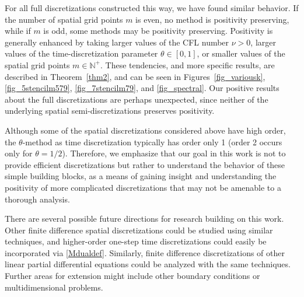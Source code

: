 \documentclass[smallextended,numbook,runningheads]{svjour3}     %
\begin{document}
For all full discretizations constructed this way, we have found similar behavior.
If the number of spatial grid points $m$ is even, no method is positivity
preserving, while if $m$ is odd, some methods may be positivity
preserving.  Positivity is generally enhanced by taking larger values
of the CFL number $\nu>0$, larger values of the time-discretization parameter $\theta\in [0,1]$, or smaller
values of the spatial grid points $m\in\mathbb{N}^+$.  These tendencies, and more specific results, are described
in Theorem~\ref{thm2}, and can be seen
in Figures~\ref{fig_variousk}, \ref{fig_5stencilm579}, \ref{fig_7stencilm79},
and \ref{fig_spectral}.
Our positive results about the full discretizations are perhaps unexpected, since neither of the underlying spatial semi-discretizations preserves positivity.

Although some of the spatial discretizations considered above have high order, the $\theta$-method as time discretization typically has order only 1 (order 2 occurs only for $\theta=1/2$). Therefore, we emphasize that our goal in this work is not to provide efficient discretizations but rather
to understand the behavior of these simple building blocks, as a means
of gaining insight and understanding the positivity of more complicated
discretizations that may not be amenable to a thorough analysis.


There are several possible future directions for research building on this
work.  Other finite difference spatial discretizations could be studied
using similar techniques, and higher-order one-step time discretizations could
easily be incorporated via \eqref{Mdualdef}.  Similarly, finite difference
discretizations of other linear partial differential equations could be analyzed with the same techniques.
Further areas for extension might 
include other boundary conditions or
multidimensional problems.



\end{document}
